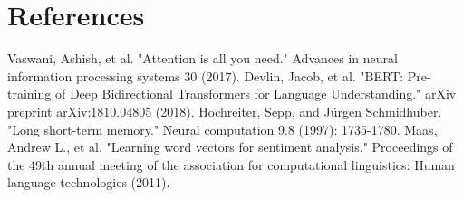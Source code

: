 \documentclass{article}
\begin{document}
\section{References}
\begin{thebibliography}{9}
 Vaswani, Ashish, et al. "Attention is all you need." Advances in neural information processing systems 30 (2017).
 Devlin, Jacob, et al. "BERT: Pre-training of Deep Bidirectional Transformers for Language Understanding." arXiv preprint arXiv:1810.04805 (2018).
 Hochreiter, Sepp, and Jürgen Schmidhuber. "Long short-term memory." Neural computation 9.8 (1997): 1735-1780.
 Maas, Andrew L., et al. "Learning word vectors for sentiment analysis." Proceedings of the 49th annual meeting of the association for computational linguistics: Human language technologies (2011).
\end{thebibliography}
\end{document}
